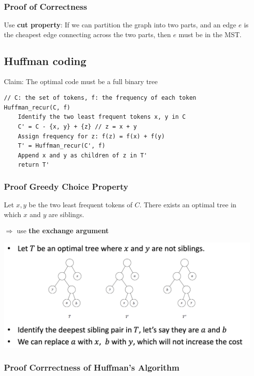 \documentclass[12pt,a4paper]{article}
\begin{document}
\subsubsection{Proof of Correctness}

Use \textbf{cut property}: If we can partition the graph into two parts, 
and an edge $e$ is the cheapest edge connecting across the two parts, then $e$ must be in the MST.

\subsection*{Huffman coding}

Claim: The optimal code must be a full binary tree

\begin{verbatim}
// C: the set of tokens, f: the frequency of each token
Huffman_recur(C, f)
    Identify the two least frequent tokens x, y in C
    C' = C - {x, y} + {z} // z = x + y
    Assign frequency for z: f(z) = f(x) + f(y)
    T' = Huffman_recur(C', f)
    Append x and y as children of z in T'
    return T'
\end{verbatim}

\subsubsection{Proof Greedy Choice Property}

Let $x,y$ be the two least frequent tokens of $C$.
There exists an optimal tree in which $x$ and $y$ are siblings.

\(\Rightarrow\) use \textbf{the exchange argument}

\includegraphics[width=\textwidth]{./images/the_exchange_argument.png}

\subsubsection*{Proof Corrrectness of Huffman's Algorithm}
\end{document}
